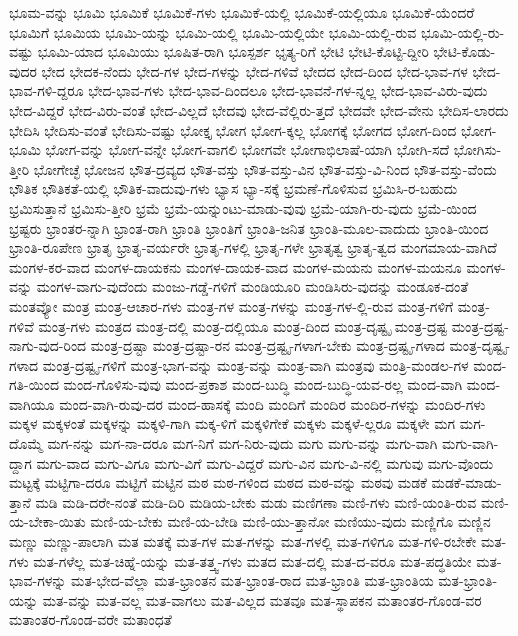 {ಭೂಮ-ವನ್ನು
ಭೂಮಿ
ಭೂಮಿಕೆ
ಭೂಮಿಕೆ-ಗಳು
ಭೂಮಿಕೆ-ಯಲ್ಲಿ
ಭೂಮಿಕೆ-ಯಲ್ಲಿಯೂ
ಭೂಮಿಕೆ-ಯೆಂದರೆ
ಭೂಮಿಗೆ
ಭೂಮಿಯ
ಭೂಮಿ-ಯನ್ನು
ಭೂಮಿ-ಯಲ್ಲಿ
ಭೂಮಿ-ಯಲ್ಲಿಯೇ
ಭೂಮಿ-ಯಲ್ಲಿ-ರುವ
ಭೂಮಿ-ಯಲ್ಲಿ-ರು-ವಷ್ಟು
ಭೂಮಿ-ಯಾದ
ಭೂಮಿಯು
ಭೂಷಿತ-ರಾಗಿ
ಭೂಸ್ಪರ್ಶ
ಭೃತ್ಯ-ರಿಗೆ
ಭೇಟಿ
ಭೇಟಿ-ಕೊಟ್ಟಿ-ದ್ದೀರಿ
ಭೇಟಿ-ಕೊಡು-ವುದರ
ಭೇದ
ಭೇದಕ-ನೆಂದು
ಭೇದ-ಗಳ
ಭೇದ-ಗಳನ್ನು
ಭೇದ-ಗಳಿವೆ
ಭೇದದ
ಭೇದ-ದಿಂದ
ಭೇದ-ಭಾವ-ಗಳ
ಭೇದ-ಭಾವ-ಗಳಿ-ದ್ದರೂ
ಭೇದ-ಭಾವ-ಗಳು
ಭೇದ-ಭಾವ-ದಿಂದಲೂ
ಭೇದ-ಭಾವನೆ-ಗಳ-ನ್ನಲ್ಲ
ಭೇದ-ಭಾವ-ವಿರು-ವುದು
ಭೇದ-ವಿದ್ದರೆ
ಭೇದ-ವಿರು-ವಂತೆ
ಭೇದ-ವಿಲ್ಲದೆ
ಭೇದವು
ಭೇದ-ವೆಲ್ಲಿರು-ತ್ತದೆ
ಭೇದವೇ
ಭೇದ-ವೇನು
ಭೇದಿಸ-ಲಾರದು
ಭೇದಿಸಿ
ಭೇದಿಸು-ವಂತೆ
ಭೇದಿಸು-ವಷ್ಟು
ಭೋಕ್ತೃ
ಭೋಗ
ಭೋಗ-ಕ್ಕಲ್ಲ
ಭೋಗಕ್ಕೆ
ಭೋಗದ
ಭೋಗ-ದಿಂದ
ಭೋಗ-ಭೂಮಿ
ಭೋಗ-ವನ್ನು
ಭೋಗ-ವನ್ನೇ
ಭೋಗ-ವಾಗಲಿ
ಭೋಗವೇ
ಭೋಗಾಭಿಲಾಷೆ-ಯಾಗಿ
ಭೋಗಿ-ಸದೆ
ಭೋಗಿಸು-ತ್ತೀರಿ
ಭೋಗೇಚ್ಛೆ
ಭೋಜನ
ಭೌತ-ದ್ರವ್ಯದ
ಭೌತ-ವಸ್ತು
ಭೌತ-ವಸ್ತು-ವಿನ
ಭೌತ-ವಸ್ತು-ವಿ-ನಿಂದ
ಭೌತ-ವಸ್ತು-ವೆಂದು
ಭೌತಿಕ
ಭೌತಿಕತೆ-ಯಲ್ಲಿ
ಭೌತಿಕ-ವಾದುವು-ಗಳು
ಭ್ಯಾಸ
ಭ್ಯಾ-ಸಕ್ಕೆ
ಭ್ರಮಣೆ-ಗೊಳಿಸುವ
ಭ್ರಮಿಸಿ-ರ-ಬಹುದು
ಭ್ರಮಿಸುತ್ತಾನೆ
ಭ್ರಮಿಸು-ತ್ತೀರಿ
ಭ್ರಮೆ
ಭ್ರಮೆ-ಯನ್ನುಂಟು-ಮಾಡು-ವುವು
ಭ್ರಮೆ-ಯಾಗಿ-ರು-ವುದು
ಭ್ರಮೆ-ಯಿಂದ
ಭ್ರಷ್ಟರು
ಭ್ರಾಂತರ-ನ್ನಾಗಿ
ಭ್ರಾಂತ-ರಾಗಿ
ಭ್ರಾಂತಿ
ಭ್ರಾಂತಿಗೆ
ಭ್ರಾಂತಿ-ಜನಿತ
ಭ್ರಾಂತಿ-ಮೂಲ-ವಾದುದು
ಭ್ರಾಂತಿ-ಯಿಂದ
ಭ್ರಾಂತಿ-ರೂಪೇಣ
ಭ್ರಾತೃ
ಭ್ರಾತೃ-ವರ್ಯರೇ
ಭ್ರಾತೃ-ಗಳಲ್ಲಿ
ಭ್ರಾತೃ-ಗಳೇ
ಭ್ರಾತೃತ್ವ
ಭ್ರಾತೃ-ತ್ವದ
ಮಂಗಮಾಯ-ವಾಗಿದೆ
ಮಂಗಳ-ಕರ-ವಾದ
ಮಂಗಳ-ದಾಯಕನು
ಮಂಗಳ-ದಾಯಕ-ವಾದ
ಮಂಗಳ-ಮಯನು
ಮಂಗಳ-ಮಯನೂ
ಮಂಗಳ-ವನ್ನು
ಮಂಗಳ-ವಾಗು-ವುದೆಂದು
ಮಂಜು-ಗಡ್ಡೆ-ಗಳಿಗೆ
ಮಂಡಿಯೂರಿ
ಮಂಡಿಸಿರು-ವುದನ್ನು
ಮಂಡೂಕ-ದಂತೆ
ಮಂತವ್ಯೋ
ಮಂತ್ರ
ಮಂತ್ರ-ಆಚಾರ-ಗಳು
ಮಂತ್ರ-ಗಳ
ಮಂತ್ರ-ಗಳನ್ನು
ಮಂತ್ರ-ಗಳ-ಲ್ಲಿ-ರುವ
ಮಂತ್ರ-ಗಳಿಗೆ
ಮಂತ್ರ-ಗಳಿವೆ
ಮಂತ್ರ-ಗಳು
ಮಂತ್ರದ
ಮಂತ್ರ-ದಲ್ಲಿ
ಮಂತ್ರ-ದಲ್ಲಿಯೂ
ಮಂತ್ರ-ದಿಂದ
ಮಂತ್ರ-ದೃಷ್ಟೃ
ಮಂತ್ರ-ದ್ರಷ್ಟ
ಮಂತ್ರ-ದ್ರಷ್ಟ-ನಾಗು-ವುದ-ರಿಂದ
ಮಂತ್ರ-ದ್ರಷ್ಟಾ
ಮಂತ್ರ-ದ್ರಷ್ಟಾ-ರನ
ಮಂತ್ರ-ದ್ರಷ್ಟೃ-ಗಳಾಗ-ಬೇಕು
ಮಂತ್ರ-ದ್ರಷ್ಟೃ-ಗಳಾದ
ಮಂತ್ರ-ದೃಷ್ಟೃ-ಗಳಾದ
ಮಂತ್ರ-ದ್ರಷ್ಟೃ-ಗಳಿಗೆ
ಮಂತ್ರ-ಭಾಗ-ವನ್ನು
ಮಂತ್ರ-ವನ್ನು
ಮಂತ್ರ-ವಾಗಿ
ಮಂತ್ರವು
ಮಂತ್ರಿ-ಮಂಡಲ-ಗಳ
ಮಂದ-ಗತಿ-ಯಿಂದ
ಮಂದ-ಗೊಳಿಸು-ವುವು
ಮಂದ-ಪ್ರಕಾಶ
ಮಂದ-ಬುದ್ಧಿ
ಮಂದ-ಬುದ್ಧಿ-ಯವ-ರಲ್ಲ
ಮಂದ-ವಾಗಿ
ಮಂದ-ವಾಗಿಯೂ
ಮಂದ-ವಾಗಿ-ರುವು-ದರ
ಮಂದ-ಹಾಸಕ್ಕೆ
ಮಂದಿ
ಮಂದಿಗೆ
ಮಂದಿರ
ಮಂದಿರ-ಗಳನ್ನು
ಮಂದಿರ-ಗಳು
ಮಕ್ಕಳ
ಮಕ್ಕಳಂತೆ
ಮಕ್ಕಳನ್ನು
ಮಕ್ಕಳಿ-ಗಾಗಿ
ಮಕ್ಕ-ಳಿಗೆ
ಮಕ್ಕಳಿಗೇಕೆ
ಮಕ್ಕಳು
ಮಕ್ಕಳೆ-ಲ್ಲರೂ
ಮಕ್ಕಳೇ
ಮಗ
ಮಗ-ದೊಮ್ಮೆ
ಮಗ-ನನ್ನು
ಮಗ-ನಾ-ದರೂ
ಮಗ-ನಿಗೆ
ಮಗ-ನಿರು-ವುದು
ಮಗು
ಮಗು-ವನ್ನು
ಮಗು-ವಾಗಿ
ಮಗು-ವಾಗಿ-ದ್ದಾಗ
ಮಗು-ವಾದ
ಮಗು-ವಿಗೂ
ಮಗು-ವಿಗೆ
ಮಗು-ವಿದ್ದರೆ
ಮಗು-ವಿನ
ಮಗು-ವಿ-ನಲ್ಲಿ
ಮಗುವು
ಮಗು-ವೊಂದು
ಮಟ್ಟಕ್ಕೆ
ಮಟ್ಟಿಗಾ-ದರೂ
ಮಟ್ಟಿಗೆ
ಮಟ್ಟಿನ
ಮಠ
ಮಠ-ಗಳಿಂದ
ಮಠದ
ಮಠ-ವನ್ನು
ಮಠವು
ಮಡಕೆ
ಮಡಕೆ-ಮಾಡು-ತ್ತಾನೆ
ಮಡಿ
ಮಡಿ-ದರೇ-ನಂತೆ
ಮಡಿ-ದಿರಿ
ಮಡಿಯ-ಬೇಕು
ಮಡು
ಮಣಿಗಣಾ
ಮಣಿ-ಗಳು
ಮಣಿ-ಯಂತಿ-ರುವ
ಮಣಿ-ಯ-ಬೇಕಾ-ಯಿತು
ಮಣಿ-ಯ-ಬೇಕು
ಮಣಿ-ಯ-ಬೇಡಿ
ಮಣಿ-ಯು-ತ್ತಾನೋ
ಮಣಿಯು-ವುದು
ಮಣ್ಣಿಗೊ
ಮಣ್ಣಿನ
ಮಣ್ಣು
ಮಣ್ಣು-ಪಾಲಾಗಿ
ಮತ
ಮತಕ್ಕೆ
ಮತ-ಗಳ
ಮತ-ಗಳನ್ನು
ಮತ-ಗಳಲ್ಲಿ
ಮತ-ಗಳಿಗೂ
ಮತ-ಗಳಿ-ರಬೇಕೇ
ಮತ-ಗಳು
ಮತ-ಗಳೆಲ್ಲ
ಮತ-ಚಿಹ್ನೆ-ಯನ್ನು
ಮತ-ತತ್ತ್ವ-ಗಳು
ಮತದ
ಮತ-ದಲ್ಲಿ
ಮತ-ದ-ವರೂ
ಮತ-ಪದ್ಧತಿಯೇ
ಮತ-ಭಾವ-ಗಳನ್ನು
ಮತ-ಭೇದ-ವೆಲ್ಲಾ
ಮತ-ಭ್ರಾಂತನ
ಮತ-ಭ್ರಾಂತ-ರಾದ
ಮತ-ಭ್ರಾಂತಿ
ಮತ-ಭ್ರಾಂತಿಯ
ಮತ-ಭ್ರಾಂತಿ-ಯನ್ನು
ಮತ-ವನ್ನು
ಮತ-ವಲ್ಲ
ಮತ-ವಾಗಲು
ಮತ-ವಿಲ್ಲದ
ಮತವೂ
ಮತ-ಸ್ಥಾಪಕನ
ಮತಾಂತರ-ಗೊಂಡ-ವರ
ಮತಾಂತರ-ಗೊಂಡ-ವರೇ
ಮತಾಂಧತೆ
}
